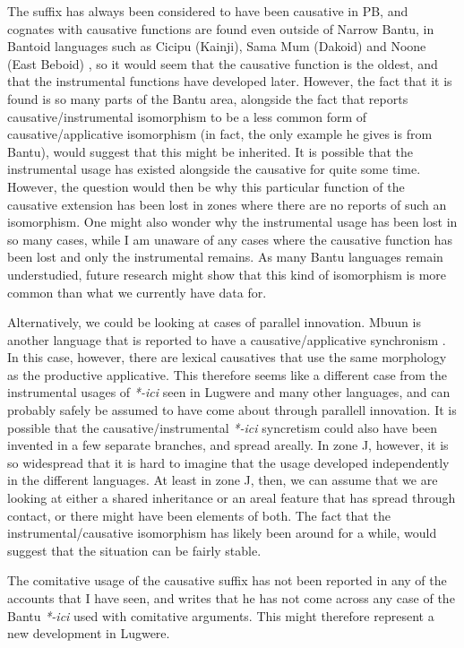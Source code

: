 \documentclass[output=paper,colorlinks,citecolor=brown,draftmode]{langscibook}
\begin{document}
The suffix has always been considered to have been causative in PB, and cognates with causative functions are found even outside of Narrow Bantu, in Bantoid languages such as Cicipu (Kainji), Sama Mum (Dakoid) and Noone (East Beboid) \citep{blench2022relevance}, so it would seem that the causative function is the oldest, and that the instrumental functions have developed later. However, the fact that it is found is so many parts of the Bantu area, alongside the fact that \citet{peterson2006applicative} reports causative/instrumental isomorphism to be a less common form of causative/applicative isomorphism (in fact, the only example he gives is from Bantu), would suggest that this might be inherited. It is possible that the instrumental usage has existed alongside the causative for quite some time. However, the question would then be why this particular function of the causative extension has been lost in zones where there are no reports of such an isomorphism. One might also wonder why the instrumental usage has been lost in so many cases, while I am unaware of any cases where the causative function has been lost and only the instrumental remains.  As many Bantu languages remain understudied, future research might show that this kind of isomorphism is more common than what we currently have data for.

 Alternatively, we could be looking at cases of parallel innovation. 
 Mbuun is another language that is reported to have a causative/applicative synchronism \citep{bostoen2011causative}. In this case, however, there are lexical causatives that use the same morphology as the productive applicative. This therefore seems like a different case from the instrumental usages of \emph{*-ici} seen in Lugwere and many other languages, and can probably safely be assumed to have come about through parallell innovation. It is possible that the causative/instrumental \emph{*-ici} syncretism could also have been invented in a few separate branches, and spread areally.  In zone J, however, it is so widespread that it is hard to imagine that the usage developed independently in the different languages. At least in zone J, then, we can assume that we are looking at either a shared inheritance or an areal feature that has spread through contact, or there might have been elements of both. The fact that the instrumental/causative isomorphism has likely been around for a while, would suggest that the situation can be fairly stable. 

The comitative usage of the causative suffix has not been reported in any of the accounts that I have seen, and \citet{peterson2006applicative} writes that he has not come across any case of the Bantu \emph{*-ici} used with comitative arguments. This might therefore represent a new development in Lugwere.  
\end{document}
